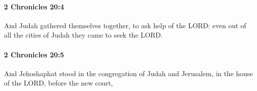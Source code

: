 		\paragraph{2 Chronicles 20:4} %
			\label{2CHRONICLES-20-4}

			And Judah gathered themselves together, to ask help of the LORD: even out of all the cities of Judah they came to seek the LORD.


		\paragraph{2 Chronicles 20:5} %
			\label{2CHRONICLES-20-5}

			And Jehoshaphat stood in the congregation of Judah and Jerusalem, in the house of the LORD, before the new court,


